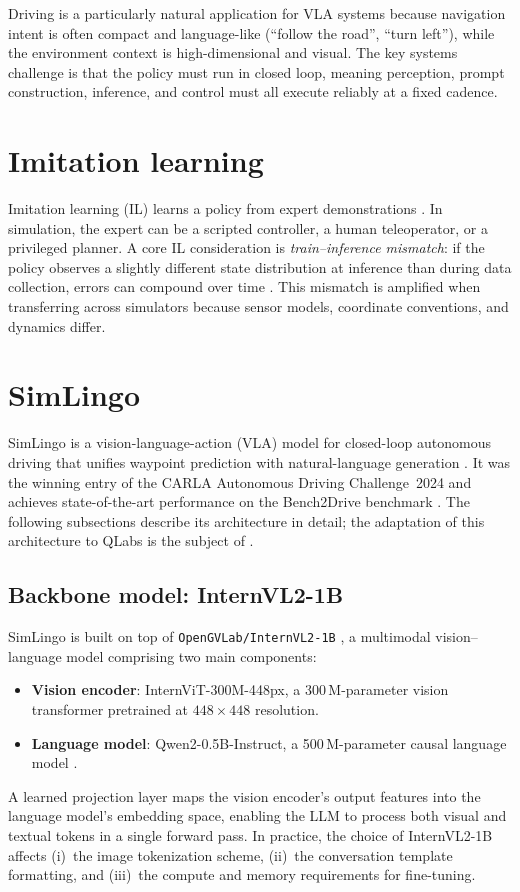 Driving is a particularly natural application for VLA systems because navigation intent is often compact and language-like (``follow the road'', ``turn left''), while the environment context is high-dimensional and visual. The key systems challenge is that the policy must run in closed loop, meaning perception, prompt construction, inference, and control must all execute reliably at a fixed cadence.

\section{Imitation learning}
Imitation learning (IL) learns a policy from expert demonstrations \citep{pomerleau1988alvinn,bojarski2016end}. In simulation, the expert can be a scripted controller, a human teleoperator, or a privileged planner. A core IL consideration is \emph{train--inference mismatch}: if the policy observes a slightly different state distribution at inference than during data collection, errors can compound over time \citep{ross2011dagger}. This mismatch is amplified when transferring across simulators because sensor models, coordinate conventions, and dynamics differ.

\section{SimLingo}
\label{sec:simlingo}
SimLingo is a vision-language-action (VLA) model for closed-loop autonomous driving that unifies waypoint prediction with natural-language generation \citep{simlingo2023}. It was the winning entry of the CARLA Autonomous Driving Challenge~2024 and achieves state-of-the-art performance on the Bench2Drive benchmark \citep{jia2024bench2drive}. The following subsections describe its architecture in detail; the adaptation of this architecture to QLabs is the subject of .

\subsection{Backbone model: InternVL2-1B}
\label{sec:internvl2}
SimLingo is built on top of \texttt{OpenGVLab/InternVL2-1B} \citep{internvl2}, a multimodal vision--language model comprising two main components:
\begin{itemize}[leftmargin=*,itemsep=0.25em]
  \item \textbf{Vision encoder}: InternViT-300M-448px, a 300\,M-parameter vision transformer \citep{dosovitskiy2021vit} pretrained at $448\times448$ resolution.
  \item \textbf{Language model}: Qwen2-0.5B-Instruct, a 500\,M-parameter causal language model \citep{yang2024qwen2}.
\end{itemize}
A learned projection layer maps the vision encoder's output features into the language model's embedding space, enabling the LLM to process both visual and textual tokens in a single forward pass. In practice, the choice of InternVL2-1B affects (i)~the image tokenization scheme, (ii)~the conversation template formatting, and (iii)~the compute and memory requirements for fine-tuning.

